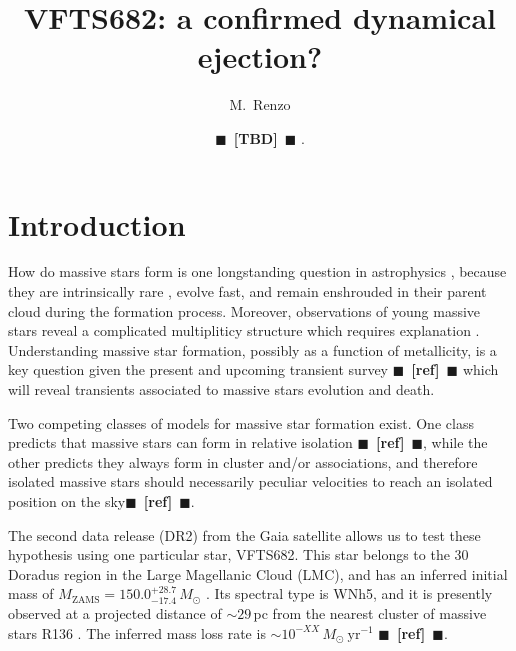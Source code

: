 \documentclass{aa}
\newcommand{\todo}[1]{{\large $\blacksquare$~\textbf{\color{red}[#1]}}~$\blacksquare$}
\begin{document}
\title{VFTS682: a confirmed dynamical ejection?}

\author{M.~Renzo \and \todo{TBD}%
  .} 

  
\date{}
\abstract{}

\maketitle{}

\section{Introduction}
\label{sec:intro}

How do massive stars form is one longstanding question in astrophysics
\citep[e.g.,][]{lada:03, zinnecker:07}, because they are intrinsically rare
\citep[e.g.,][]{salpeter:55,kroupa:01, schneider:18}, evolve fast, and
remain enshrouded in their parent cloud during the formation
process. Moreover, observations of young massive stars reveal a
complicated multipliticy structure which requires
explanation \citep[][]{sana:12,sana:17}. Understanding massive star formation, possibly as a
function of metallicity, is a key question given the present and upcoming
transient survey \citep[e.g., LSST, BlackGem, LIGO/Virgo O3][]{}\todo{ref} which
will reveal transients associated to massive stars
evolution and death.

Two competing classes of models for massive star formation exist. One class predicts 
that massive stars can form in relative isolation \todo{ref}, while the other predicts
they always form in cluster and/or associations, and therefore
isolated massive stars should necessarily peculiar velocities to reach
an isolated position on the sky\todo{ref}.

The second data release (DR2) from the Gaia satellite
\cite[][]{gaia:16,brown:18} allows us to test
these hypothesis using one particular star, VFTS682. 
This star belongs to the 30 Doradus region in the Large Magellanic
Cloud (LMC), and has an inferred initial mass of $M_\mathrm{ZAMS}=150.0^{+28.7}_{-17.4}\,M_\odot$
\citep[][]{bestenlehner:11,schneider:18}. Its spectral type is WNh5, and it is presently observed at a
projected distance of $\sim$$29$\,pc from the nearest cluster of
massive stars R136 \citep[also known as NGC2070][]{bestenlehner:11}. The inferred mass loss
rate is $\sim10^{-XX}\,M_\odot \ \mathrm{yr}^{-1}$ \todo{ref}.
\end{document}
